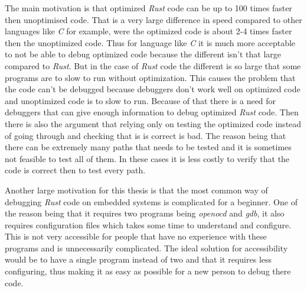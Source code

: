 


The main motivation is that optimized \emph{Rust} code can be up to 100 times faster then unoptimised code. %
That is a very large difference in speed compared to other languages like \emph{C} for example, were the optimized code is about 2-4 times faster then the unoptimized code. %
Thus for language like \emph{C} it is much more acceptable to not be able to debug optimized code because the different isn't that large compared to \emph{Rust}.
But in the case of \emph{Rust} code the different is so large that some programs are to slow to run without optimization.
This causes the problem that the code can't be debugged because debuggers don't work well on optimized code and unoptimized code is to slow to run.
Because of that there is a need for debuggers that can give enough information to debug optimized \emph{Rust} code.
Then there is also the argument that relying only on testing the optimized code instead of going through and checking that is is correct is bad.
The reason being that there can be extremely many paths that needs to be tested and it is sometimes not feasible to test all of them.
In these cases it is less costly to verify that the code is correct then to test every path.


Another large motivation for this thesis is that the most common way of debugging \emph{Rust} code on embedded systems is complicated for a beginner.
One of the reason being that it requires two programs being \emph{openocd} and \emph{gdb}, it also requires configuration files which takes some time to understand and configure.
This is not very accessible for people that have no experience with these programs and is unnecessarily complicated.
The ideal solution for accessibility would be to have a single program instead of two and that it requires less configuring, thus making it as easy as possible for a new person to debug there code.


